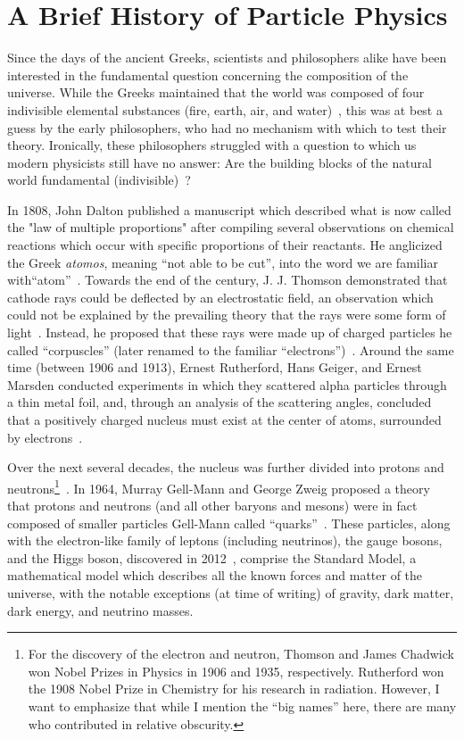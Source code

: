 \section{A Brief History of Particle Physics}\label{sec:a_brief_history_of_particle_physics}

Since the days of the ancient Greeks, scientists and philosophers alike have been interested in the fundamental question concerning the composition of the universe. While the Greeks maintained that the world was composed of four indivisible elemental substances (fire, earth, air, and water)~\cite{aristotle_metaphysics_350bce}, this was at best a guess by the early philosophers, who had no mechanism with which to test their theory. Ironically, these philosophers struggled with a question to which us modern physicists still have no answer: Are the building blocks of the natural world fundamental (indivisible)~\cite{aristotle_physics_350bce}?

In 1808, John Dalton published a manuscript which described what is now called the "law of multiple proportions" after compiling several observations on chemical reactions which occur with specific proportions of their reactants. He anglicized the Greek \textit{atomos}, meaning ``not able to be cut'', into the word we are familiar with\textemdash ``atom''~\cite{dalton_new_1808}. Towards the end of the century, J. J. Thomson demonstrated that cathode rays could be deflected by an electrostatic field, an observation which could not be explained by the prevailing theory that the rays were some form of light~\cite{thomson_cathode_1897}. Instead, he proposed that these rays were made up of charged particles he called ``corpuscles'' (later renamed to the familiar ``electrons'')~\cite{thomson_corpuscular_1907}. Around the same time (between 1906 and 1913), Ernest Rutherford, Hans Geiger, and Ernest Marsden conducted experiments in which they scattered alpha particles through a thin metal foil, and, through an analysis of the scattering angles, concluded that a positively charged nucleus must exist at the center of atoms, surrounded by electrons~\cite{rutherford_lxxix_1911}.

Over the next several decades, the nucleus was further divided into protons and neutrons\footnote{For the discovery of the electron and neutron, Thomson and James Chadwick won Nobel Prizes in Physics in 1906 and 1935, respectively. Rutherford won the 1908 Nobel Prize in Chemistry for his research in radiation. However, I want to emphasize that while I mention the ``big names'' here, there are many who contributed in relative obscurity.}~\cite{masson_xxiv_1921,chadwick_possible_1932}. In 1964, Murray Gell-Mann and George Zweig proposed a theory that protons and neutrons (and all other baryons and mesons) were in fact composed of smaller particles Gell-Mann called ``quarks''~\cite{gell-mann_schematic_1964}. These particles, along with the electron-like family of leptons (including neutrinos), the gauge bosons, and the Higgs boson, discovered in 2012~\cite{aad_observation_2012}, comprise the Standard Model, a mathematical model which describes all the known forces and matter of the universe, with the notable exceptions (at time of writing) of gravity, dark matter, dark energy, and neutrino masses.

